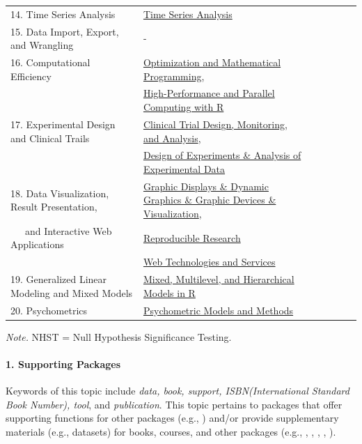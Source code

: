 \begin{table}[h]
\begin{center}
{\begin{tabular}{lllllll}
14. Time Series Analysis & \href{https://cran.r-project.org/web/views/TimeSeries.html}{Time Series Analysis}\\
15. Data Import, Export, and Wrangling &  - \\
16. Computational Efficiency & \href{https://cran.r-project.org/web/views/Optimization.html}{Optimization and Mathematical Programming},
\\ & \href{https://cran.r-project.org/web/views/HighPerformanceComputing.html}{High-Performance and Parallel Computing with R} \\
17. Experimental Design and Clinical Trails & \href{https://cran.r-project.org/web/views/ClinicalTrials.html}{Clinical Trial Design, Monitoring, and Analysis},
\\ & \href{https://cran.r-project.org/web/views/ExperimentalDesign.html}{Design of Experiments \& Analysis of Experimental Data} \\
18. Data Visualization, Result Presentation,  & \href{https://cran.r-project.org/web/views/Graphics.html}{Graphic Displays \& Dynamic Graphics \& Graphic Devices \& Visualization},
\\ \,\,\,\,\,\,\, and Interactive Web Applications & \href{https://cran.r-project.org/web/views/ReproducibleResearch.html}{Reproducible Research} \\
& \href{https://cran.r-project.org/web/views/WebTechnologies.html}{Web Technologies and Services} \\
19. Generalized Linear Modeling and Mixed Models & \href{https://cran.r-project.org/web/views/MixedModels.html}{Mixed, Multilevel, and Hierarchical Models in R} \\
20. Psychometrics & \href{https://cran.r-project.org/web/views/Psychometrics.html}{Psychometric Models and Methods} \\
\bottomrule
\end{tabular}}
{\small
\textit{Note.} NHST = Null Hypothesis Significance Testing.
}

\end{center}
\end{table}




\paragraph{1. Supporting Packages} Keywords of this topic include {\it data, book, support, ISBN(International Standard Book Number), tool}, and {\it publication}.  This topic pertains to packages that offer supporting functions for other packages (e.g., ) and/or provide supplementary materials (e.g., datasets) for books, courses, and other packages (e.g., , , , , ). 



